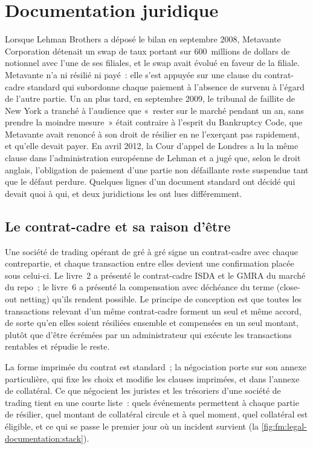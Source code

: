 \chapter{Documentation juridique}\label{ch:fm:legal-documentation}

Lorsque Lehman Brothers a déposé le bilan en septembre 2008, Metavante Corporation détenait un swap de taux portant sur 600~millions de dollars de notionnel avec
l'une de ses filiales, et le swap avait évolué en faveur de la filiale. Metavante n'a ni résilié ni payé~: elle s'est appuyée sur une clause du
contrat-cadre standard qui subordonne chaque paiement à l'absence de  survenu à l'égard de l'autre partie. Un an
plus tard, en septembre 2009, le tribunal de faillite de New York a tranché à l'audience que «~rester sur le marché pendant un an, sans
prendre la moindre mesure~» était contraire à l'esprit du Bankruptcy Code, que Metavante avait renoncé à son droit de résilier en ne l'exerçant pas
rapidement, et qu'elle devait payer. En avril 2012, la Cour d'appel de Londres a lu la même clause dans l'administration européenne de Lehman et a jugé
que, selon le droit anglais, l'obligation de paiement d'une partie non défaillante reste suspendue tant que le défaut perdure. Quelques lignes d'un
document standard ont décidé qui devait quoi à qui, et deux juridictions les ont lues différemment.

\section{Le contrat-cadre et sa raison d'être}

Une société de trading opérant de gré à gré signe un contrat-cadre avec chaque contrepartie, et chaque transaction entre elles devient une confirmation placée sous celui-ci.
Le livre~2 a présenté le contrat-cadre ISDA et le GMRA du marché du repo~; le livre~6 a présenté la compensation avec déchéance du terme (close-out netting) qu'ils rendent possible. Le principe de conception est que
toutes les transactions relevant d'un même contrat-cadre forment un seul et même accord, de sorte qu'en  elles soient résiliées ensemble et compensées en un seul montant, plutôt
que d'être écrémées par un administrateur qui exécute les transactions rentables et répudie le reste.

La forme imprimée du contrat est standard~; la négociation porte sur son annexe particulière, qui fixe les choix et modifie les clauses imprimées, et dans l'annexe
de collatéral. Ce que négocient les juristes et les trésoriers d'une société de trading tient en une courte liste~: quels événements permettent à chaque partie de résilier, quel montant de collatéral circule
et à quel moment, quel collatéral est éligible, et ce qui se passe le premier jour où un incident survient (la \cref{fig:fm:legal-documentation:stack}).

